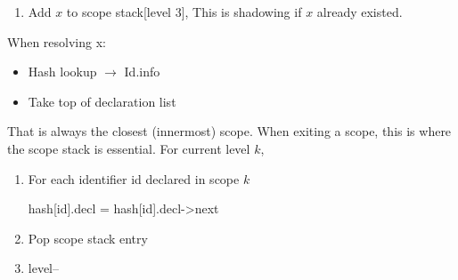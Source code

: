 \documentclass{report}
\begin{document}
\begin{itemize}
\begin{enumerate}
                        \bigbreak \noindent 
                        \begin{cppcode}
                        hash["x"].decl = new_node
                        \end{cppcode}
                    \item Add $x$ to scope stack[level 3], This is shadowing if $x$ already existed.
                \end{enumerate}
                When resolving x:
                \begin{itemize}
                    \item Hash lookup $\to$ Id.info
                    \item Take top of declaration list
                \end{itemize}
                That is always the closest (innermost) scope. When exiting a scope, this is where the scope stack is essential.
                \bigbreak \noindent 
                For current level $k$, 
                \begin{enumerate}
                    \item For each identifier id declared in scope $k$
                        \bigbreak \noindent 
                        \begin{cppcode}
                        hash[id].decl = hash[id].decl->next
                        \end{cppcode}
                    \item Pop scope stack entry
                    \item level--
                    
                \end{enumerate}






        \end{itemize}

        \pagebreak 
\end{document}
